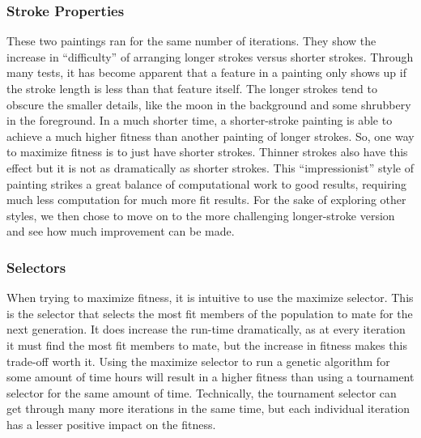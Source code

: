 \subsubsection{Stroke Properties}
These two paintings ran for the same number of iterations. They show the increase in ``difficulty'' of arranging longer strokes versus shorter strokes. Through many tests, it has become apparent that a feature in a painting only shows up if the stroke length is less than that feature itself. The longer strokes tend to obscure the smaller details, like the moon in the background and some shrubbery in the foreground. In a much shorter time, a shorter-stroke painting is able to achieve a much higher fitness than another painting of longer strokes. So, one way to maximize fitness is to just have shorter strokes. Thinner strokes also have this effect but it is not as dramatically as shorter strokes. This ``impressionist'' style of painting strikes a great balance of computational work to good results, requiring much less computation for much more fit results.  For the sake of exploring other styles, we then chose to move on to the more challenging longer-stroke version and see how much improvement can be made.

\subsubsection{Selectors}
When trying to maximize fitness, it is intuitive to use the maximize selector. This is the selector that selects the most fit members of the population to mate for the next generation. It does increase the run-time dramatically, as at every iteration it must find the most fit members to mate, but the increase in fitness makes this trade-off worth it. Using the maximize selector to run a genetic algorithm for some amount of time hours will result in a higher fitness than using a tournament selector for the same amount of time. Technically, the tournament selector can get through many more iterations in the same time, but each individual iteration has a lesser positive impact on the fitness. 




